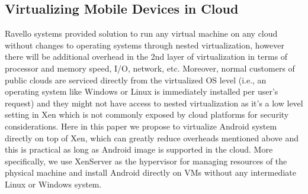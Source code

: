 \documentclass[journal,comsoc]{IEEEtran}
\begin{document}
\subsection{Virtualizing Mobile Devices in Cloud}
Ravello systems provided solution to run any virtual machine on any cloud without changes to operating systems through nested virtualization, however there will be additional overhead in the 2nd layer of virtualization in terms of processor and memory speed, I/O, network, etc. Moreover, normal customers of public clouds are serviced directly from the virtualized OS level (i.e., an operating system like Windows or Linux is immediately installed per user's request) and they might not have access to nested virtualization as it's a low level setting in Xen which is not commonly exposed by cloud platforms for security considerations. Here in this paper we propose to virtualize Android system directly on top of Xen, which can greatly reduce overheads mentioned above and this is practical as long as Android image is supported in the cloud. More specifically, we use XenServer as the hypervisor for managing resources of the physical machine and install Android directly on VMs without any intermediate Linux or Windows system.
\end{document}
